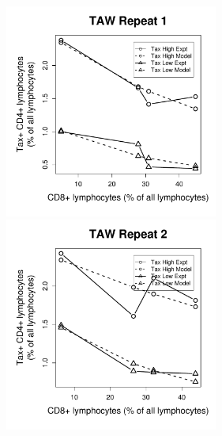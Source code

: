 \begin{figure}[htp]
\includegraphics[width=7cm]{./Figures/chapter5/figure_lysis_taw_rep_1}%
\hspace{0cm}%
\includegraphics[width=7cm]{./Figures/chapter5/figure_lysis_taw_rep_2} \\
\end{figure}


